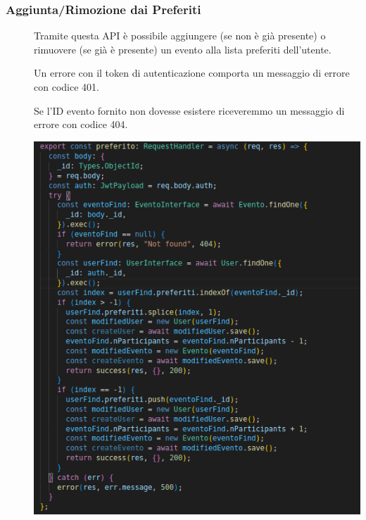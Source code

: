 \documentclass{article}
\begin{document}
\subsubsection{Aggiunta/Rimozione dai Preferiti}
\begin{description}
    \item[] Tramite questa API è possibile aggiungere (se non è già presente) o rimuovere (se già è presente) un evento alla lista preferiti dell'utente.
    \item[] Un errore con il token di autenticazione comporta un messaggio di errore con codice 401.
    \item[] Se l'ID evento fornito non dovesse esistere riceveremmo un messaggio di errore con codice 404.
    \item[] \begin{center}
            \includegraphics[scale=0.5]{preferitoEvent.png}
        \end{center}
\end{description}
\clearpage
\end{document}
